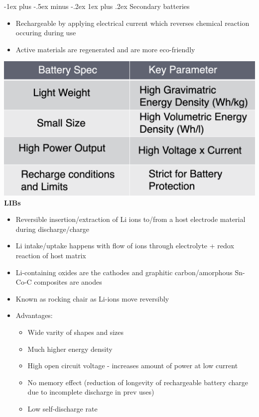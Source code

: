 \documentclass{article}
\makeatletter
\renewcommand{\subsubsection}{\@startsection{subsubsection}{3}{0mm}%
    {-1ex plus -.5ex minus -.2ex}%
    {1ex plus .2ex}%
{\normalfont\small\bfseries}}%
\makeatother
\begin{document}
\begin{multicols*}{4}
\subsubsection{Secondary batteries}
\begin{itemize}
	\item Rechargeable by applying electrical current which reverses chemical reaction occuring during use
	\item Active materials are regenerated and are more eco-friendly
\end{itemize}
\includegraphics[scale=0.18]{parameters-secondary-battery}\\
\textbf{LIBs}
\begin{itemize}
	\item Reversible insertion/extraction of Li ions to/from a host electrode material during discharge/charge
	\item Li intake/uptake happens with flow of ions through electrolyte + redox reaction of host matrix
	\item Li-containing oxides are the cathodes and graphitic carbon/amorphous Sn-Co-C composites are anodes
	\item Known as rocking chair as Li-ions move reversibly
	\item Advantages:
	\begin{itemize}
		\item Wide varity of shapes and sizes
		\item Much higher energy density
		\item High open circuit voltage - increases amount of power at low current
		\item No memory effect (reduction of longevity of rechargeable battery charge due to incomplete discharge in prev uses)
		\item Low self-discharge rate
	\end{itemize}

\end{itemize}
\end{multicols*}
\end{document}
